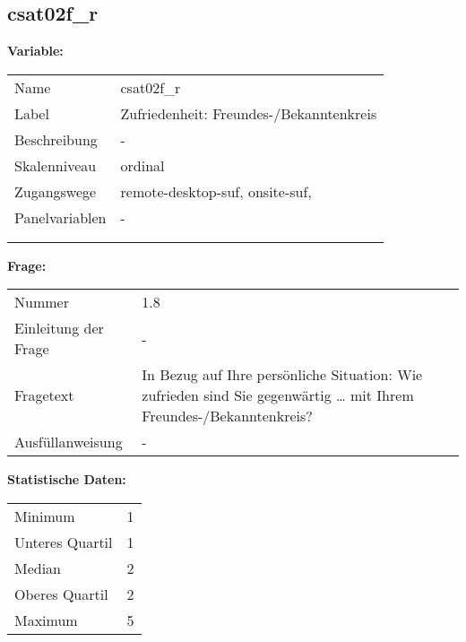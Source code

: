 	
	
	\subsection{csat02f\_r}
	\label{subSection:csat02f_r}

	\noindent\textbf{Variable:}\\
		\begin{tabular}{lL{11.3cm}}
			\label{tableVariable:csat02f_r}
			Name & csat02f\_r \\
			Label & Zufriedenheit: Freundes-/Bekanntenkreis \\
			Beschreibung & - \\
			Skalenniveau & ordinal \\
			Zugangswege &
				remote-desktop-suf,
				onsite-suf,
 \\
			Panelvariablen & -
			 \\
			 \\
 \\
		\end{tabular}

		\vspace*{1 cm}
		\noindent\textbf{Frage:}\\
		\begin{tabular}{lL{11.3cm}}
			\label{tableQuestion:csat02f_r}
			Nummer & 1.8 \\
			Einleitung der Frage & - \\
			Fragetext & In Bezug auf Ihre persönliche Situation: Wie zufrieden sind Sie gegenwärtig …
mit Ihrem Freundes-/Bekanntenkreis? \\
			Ausfüllanweisung & - \\
		\end{tabular}


		\vspace*{1 cm}
		\noindent\textbf{Statistische Daten:}\\
			\begin{tabular}{ll}
				\label{tableStatistics:csat02f_r}
					Minimum & 1 \\
					Unteres Quartil & 1 \\
					Median & 2 \\
					Oberes Quartil & 2 \\
					Maximum & 5 \\
			\end{tabular}




